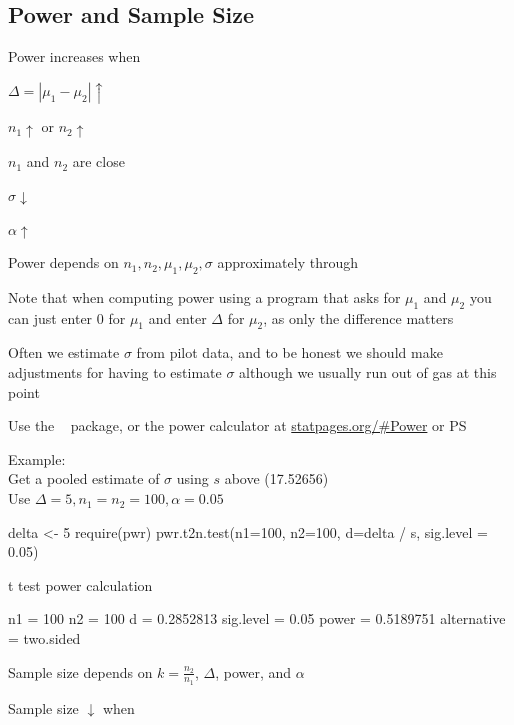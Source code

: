 \subsection{Power and Sample Size}
\bi
\item Power increases when
 \bi
 \item $\Delta = |\mu_{1}-\mu_{2}| \uparrow$
 \item $n_{1} \uparrow$ or $n_{2} \uparrow$
 \item $n_{1}$ and $n_{2}$ are close
 \item $\sigma \downarrow$
 \item $\alpha \uparrow$
 \ei
\item Power depends on $n_{1}, n_{2}, \mu_{1}, \mu_{2}, \sigma$
  approximately through 
\beq
{}
\eeq
\item Note that when computing power using a program that asks for
  $\mu_{1}$ and $\mu_{2}$ you can just enter 0 for $\mu_{1}$ and enter
  $\Delta$ for $\mu_{2}$, as only the difference matters
\item Often we estimate $\sigma$ from pilot data, and to be honest we
  should make adjustments for having to estimate $\sigma$ although we
  usually run out of gas at this point
\item Use the \R\  package, or the power calculator at
  \url{statpages.org/#Power} or PS 
\item Example: \\
 Get a pooled estimate of $\sigma$ using $s$ above (17.52656) \\
 Use $\Delta=5, n_{1}=n_{2}=100, \alpha=0.05$
\begin{Schunk}
\begin{Sinput}
delta <- 5
require(pwr)
pwr.t2n.test(n1=100, n2=100, d=delta / s, sig.level = 0.05)
\end{Sinput}
\begin{Soutput}

     t test power calculation 

             n1 = 100
             n2 = 100
              d = 0.2852813
      sig.level = 0.05
          power = 0.5189751
    alternative = two.sided
\end{Soutput}
\end{Schunk}
\item Sample size depends on $k = \frac{n_{2}}{n_{1}}$, $\Delta$, power,
  and $\alpha$
\item Sample size $\downarrow$ when
